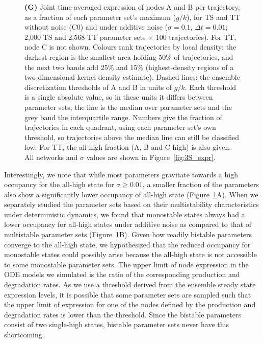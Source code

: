 \documentclass[11pt]{article}
\providecommand{\DIFaddtex}[1]{{\protect\color{red}#1}} %
\providecommand{\DIFdeltex}[1]{} %
\providecommand{\DIFaddbegin}{} %
\providecommand{\DIFaddend}{} %
\providecommand{\DIFdelbegin}{} %
\providecommand{\DIFdelend}{} %
\providecommand{\DIFaddFL}[1]{\DIFadd{#1}} %
\providecommand{\DIFaddbeginFL}{} %
\providecommand{\DIFaddendFL}{} %
\providecommand{\DIFadd}[1]{\texorpdfstring{\DIFaddtex{#1}}{#1}} %
\providecommand{\DIFdel}[1]{\texorpdfstring{\DIFdeltex{#1}}{}} %
\providecommand{\DIFaddincludegraphics}[2][]{\DIFOincludegraphics[#1]{#2}} %
\providecommand{\DIFdelincludegraphics}[2][]{}
\DeclareRobustCommand{\DIFaddbegin}{\DIFOaddbegin \let\includegraphics\DIFaddincludegraphics} %
\DeclareRobustCommand{\DIFaddend}{\DIFOaddend \let\includegraphics\DIFOincludegraphics} %
\DeclareRobustCommand{\DIFdelbegin}{\DIFOdelbegin \let\includegraphics\DIFdelincludegraphics} %
\DeclareRobustCommand{\DIFdelend}{\DIFOaddend \let\includegraphics\DIFOincludegraphics} %
\DeclareRobustCommand{\DIFaddbeginFL}{\DIFOaddbeginFL \let\includegraphics\DIFaddincludegraphics} %
\DeclareRobustCommand{\DIFaddendFL}{\DIFOaddendFL \let\includegraphics\DIFOincludegraphics} %
\begin{document}
\begin{figure}
{    \DIFaddbeginFL \textbf{\DIFaddFL{(G)}} \DIFaddFL{Joint time-averaged expression of nodes A and B per trajectory, as a fraction of each parameter set's maximum ($g/k$), for TS and TT without noise (C0) and under additive noise ($\sigma = 0.1$, $\Delta t = 0.01$; 2,000 TS and 2,568 TT parameter sets $\times$ 100 trajectories). For TT, node C is not shown. Colours rank trajectories by local density: the darkest region is the smallest area holding 50\% of trajectories, and the next two bands add 25\% and 15\% (highest-density regions of a two-dimensional kernel density estimate). Dashed lines: the ensemble discretization thresholds of A and B in units of $g/k$. Each threshold is a single absolute value, so in these units it differs between parameter sets; the line is the median over parameter sets and the grey band the interquartile range. Numbers give the fraction of trajectories in each quadrant, using each parameter set's own threshold, so trajectories above the median line can still be classified low. For TT, the all-high fraction (A, B and C high) is also given. All networks and $\sigma$ values are shown in Figure~\ref{fig:3S_expr}.
}\DIFaddendFL }
    \label{fig:3}
\end{figure}

Interestingly, we note that while most parameters gravitate towards a high \DIFdelbegin \DIFdel{MRT }\DIFdelend \DIFaddbegin \DIFadd{occupancy }\DIFaddend for the all-high state for $\sigma \geq 0.01$, a smaller fraction of the parameters also show a significantly lower \DIFdelbegin \DIFdel{MRT }\DIFdelend \DIFaddbegin \DIFadd{occupancy }\DIFaddend of all-high state (Figure~\ref{fig:3}A). When we separately studied the parameter sets based on their multistability characteristics under deterministic dynamics, we found that monostable states always had a lower \DIFdelbegin \DIFdel{MRT }\DIFdelend \DIFaddbegin \DIFadd{occupancy }\DIFaddend for all-high states under additive noise as compared to that of multistable parameter sets (Figure~\ref{fig:3}B). Given how readily bistable parameters converge to the all-high state, we hypothesized that the reduced \DIFdelbegin \DIFdel{MRT }\DIFdelend \DIFaddbegin \DIFadd{occupancy }\DIFaddend for monostable states could possibly arise because the all-high state is not accessible to some monostable parameter sets.  The upper limit of node expression in the ODE models we simulated is the ratio of the corresponding production and degradation rates. As we use a threshold derived from the ensemble steady state expression levels, it is possible that some parameter sets are sampled such that the upper limit of expression for one of the nodes defined by the production and degradation rates is lower than the threshold. Since the bistable parameters consist of two single-high states, bistable parameter sets never have this shortcoming. 
\end{document}
